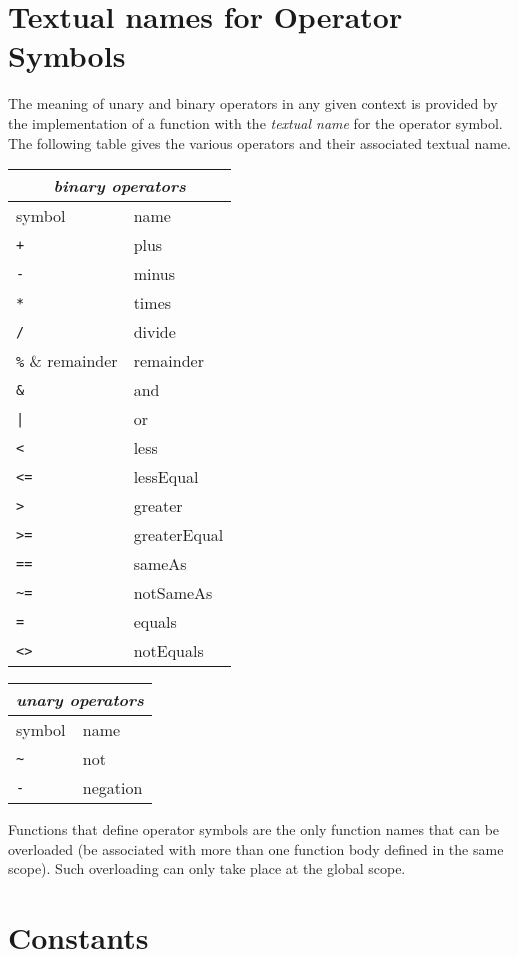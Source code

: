 \section{Textual names for Operator Symbols}\label{gr12}

The meaning of unary and binary operators in any given context is provided
by the implementation of a function with the {\em textual name\/} for the
operator symbol.  The following table gives the various operators
and their associated textual name.

\begin{center}
\begin{tabular}{| l | l |}
\multicolumn{2}{c}{\em binary operators} \\
\hline
symbol & name \\
\hline
\verb-+- & plus \\
\verb+-+ & minus \\
\verb+*+ & times \\
\verb+/+ & divide \\
\verb+%+ & remainder \\
\verb+&+ & and \\
\verb+|+ & or \\
\verb+<+ & less \\
\verb+<=+ & lessEqual \\
\verb+>+ & greater \\
\verb+>=+ & greaterEqual \\
\verb+==+ & sameAs \\
\verb+~=+ & notSameAs \\
\verb+=+ & equals \\
\verb+<>+ & notEquals \\
\hline
\end{tabular} \begin{tabular}{| l | l |}
\multicolumn{2}{c}{\em unary operators} \\
\hline
symbol & name \\
\hline
\verb+~+ & not \\
\verb+-+ & negation \\
\hline
\end{tabular}
\end{center}

Functions that define operator symbols are the only function names that
can be overloaded (be associated with more than one function body defined
in the same scope).  Such overloading can only take place at the
global scope.

\section{Constants}\label{gr11}

